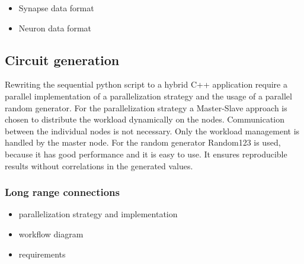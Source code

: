 \documentclass[a4paper]{article}
\begin{document}
\begin{itemize}
      \item Synapse data format
      \item Neuron data format
\end{itemize}

\subsection{Circuit generation}
Rewriting the sequential python script to a hybrid C++ application require a parallel implementation of a parallelization strategy and the usage of 
a parallel random generator. For the parallelization strategy a Master-Slave approach is chosen to distribute the workload dynamically on the nodes.
Communication between the individual nodes is not necessary. Only the workload management is handled by the master node.
For the random generator Random123 is used, because it has good performance and it is easy to use.
It ensures reproducible results without correlations in the generated values. 


\subsubsection{Long range connections}


\begin{itemize}
      \item parallelization strategy and implementation
      \item workflow diagram
      \item requirements 
\end{itemize}
\end{document}
